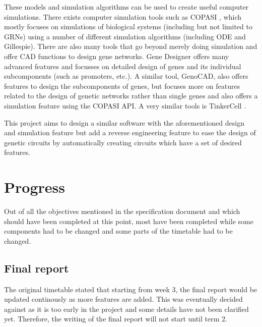 \documentclass{article}
\begin{document}
	\par These models and simulation algorithms can be used to create useful computer simulations. There exists computer simulation tools such as COPASI \cite{copasi}, which mostly focuses on simulations of biological systems (including but not limited to GRNs) using a number of different simulation algorithms (including ODE and Gillespie). There are also many tools that go beyond merely doing simulation and offer CAD functions to design gene networks. Gene Designer \cite{gene_designer} offers many advanced features and focusses on detailed design of genes and its individual subcomponents (such as promoters, etc.). A similar tool, GenoCAD\cite{genocad}, also offers features to design the subcomponents of genes, but focuses more on features related to the design of genetic networks rather than single genes and also offers a simulation feature using the COPASI API. A very similar tools is TinkerCell \cite{tinkercell}. 
	\par This project aims to design a similar software with the aforementioned design and simulation feature but add a reverse engineering feature to ease the design of genetic circuits by automatically creating circuits which have a set of desired features.
	
	\section{Progress}
	
	Out of all the objectives mentioned in the specification document and which should have been completed at this point, most have been completed while some components had to be changed and some parts of the timetable had to be changed.
	
	\subsection{Final report} 
	The original timetable stated that starting from week 3, the final report would be updated continously as more features are added. This was eventually decided against as it is too early in the project and some details have not been clarified yet. Therefore, the writing of the final report will not start until term 2.
	
\end{document}
